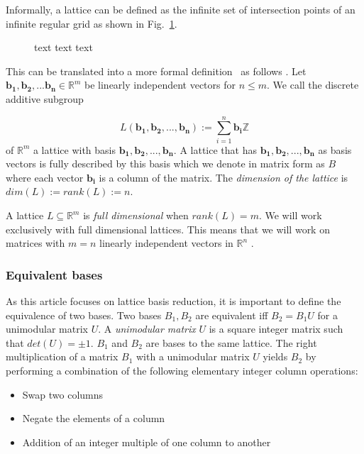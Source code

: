 \documentclass[10pt, a4paper]{article}
\newcommand{\my}[1]{{\color{blue} #1 }}
\renewcommand{\vec}[1]{\mathbf{#1}}
\begin{document}
Informally, a lattice can be defined as the infinite set of intersection points of an infinite regular grid as shown in Fig.~\ref{fig:latti}.
\begin{figure}
\centering

\hspace{2cm}


\caption{\my{text text text}}
\label{fig:latti}
\end{figure}

This can be translated into a more formal definition~\cite{SchnorrStanfordNotes} \my{as follows}.\newline 
Let $\vec{b_1}, \vec{b_2}, ... \vec{b_n} \in \mathbb{R}^m$ be linearly independent vectors for $n\leq m$. We call the discrete additive subgroup

\[
L(\vec{b_1}, \vec{b_2},..., \vec{b_n}):= \displaystyle\sum_{i=1}^{n} \vec{b_i} \mathbb{Z}
\] of $\mathbb{R}^m$ a lattice with basis $\vec{b_1,b_2,...,b_n}$.
A lattice that has $\vec{b_1},\vec{b_2},...,\vec{b_n}$ as basis vectors is fully described by this basis which we denote in matrix form as $B$ where each vector $\vec{b_i}$ is a column of the matrix.
The \emph{dimension of the lattice} is $dim(L) := rank(L) := n$.

A lattice $L \subseteq \mathbb{R}^m$ is \emph{full dimensional} when $rank(L)=m$. We will work exclusively with full dimensional lattices. This means that we will work on matrices with $m=n$ linearly independent vectors \my{in $\mathbb{R}^n$}.

\subsubsection{Equivalent bases}

As this article focuses on lattice basis reduction, it is important to define the equivalence of two bases. Two bases $B_1 , B_2$ are equivalent iff $B_2 = B_1 U$ for a unimodular matrix $U$.
A \emph{unimodular matrix} $U$ is a square integer matrix such that $det(U) = \pm 1$. \my{$B_1$ and $B_2$ are bases to the same lattice.} The right multiplication of a matrix $B_1$ with a unimodular matrix $U$ yields $B_2$ by performing a combination of the following \my{elementary integer} column operations:
\begin{itemize}
\item Swap two columns
\item Negate the elements of a column
\item Addition of an integer multiple of one column to another
\end{itemize}
\end{document}

